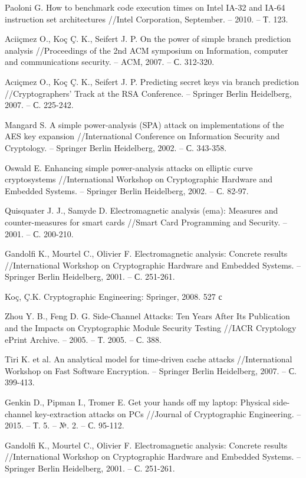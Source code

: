 \begin{thebibliography}{00}
  Paoloni G. How to benchmark code execution times on Intel IA-32 and IA-64 instruction set architectures //Intel Corporation, September. – 2010. – Т. 123.

  Aciiçmez O., Koç Ç. K., Seifert J. P. On the power of simple branch prediction analysis //Proceedings of the 2nd ACM symposium on Information, computer and communications security. – ACM, 2007. – С. 312-320.

  Acıiçmez O., Koç Ç. K., Seifert J. P. Predicting secret keys via branch prediction //Cryptographers’ Track at the RSA Conference. – Springer Berlin Heidelberg, 2007. – С. 225-242.

  Mangard S. A simple power-analysis (SPA) attack on implementations of the AES key expansion //International Conference on Information Security and Cryptology. – Springer Berlin Heidelberg, 2002. – С. 343-358.

  Oswald E. Enhancing simple power-analysis attacks on elliptic curve cryptosystems //International Workshop on Cryptographic Hardware and Embedded Systems. – Springer Berlin Heidelberg, 2002. – С. 82-97.

  Quisquater J. J., Samyde D. Electromagnetic analysis (ema): Measures and counter-measures for smart cards //Smart Card Programming and Security. – 2001. – С. 200-210.

  Gandolfi K., Mourtel C., Olivier F. Electromagnetic analysis: Concrete results //International Workshop on Cryptographic Hardware and Embedded Systems. – Springer Berlin Heidelberg, 2001. – С. 251-261.

  Ko{\c{c}}, \c{C}.K. Cryptographic Engineering: Springer, 2008. 527 с

  Zhou Y. B., Feng D. G. Side-Channel Attacks: Ten Years After Its Publication and the Impacts on Cryptographic Module Security Testing //IACR Cryptology ePrint Archive. – 2005. – Т. 2005. – С. 388.

  Tiri K. et al. An analytical model for time-driven cache attacks //International Workshop on Fast Software Encryption. – Springer Berlin Heidelberg, 2007. – С. 399-413.

  Genkin D., Pipman I., Tromer E. Get your hands off my laptop: Physical side-channel key-extraction attacks on PCs //Journal of Cryptographic Engineering. – 2015. – Т. 5. – №. 2. – С. 95-112. 

  Gandolfi K., Mourtel C., Olivier F. Electromagnetic analysis: Concrete results //International Workshop on Cryptographic Hardware and Embedded Systems. – Springer Berlin Heidelberg, 2001. – С. 251-261.


\end{thebibliography}
